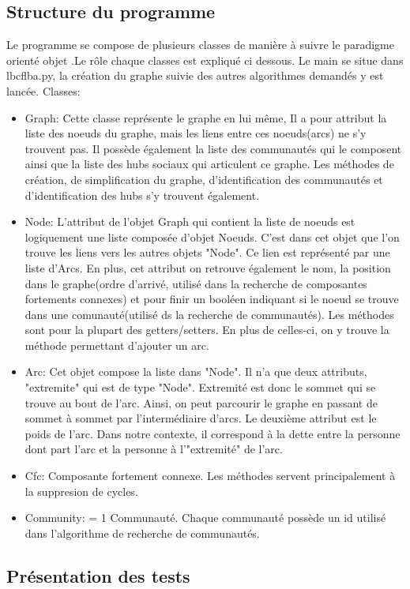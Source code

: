 \documentclass[a4paper]{article}
\begin{document}
\subsection{Structure du programme}
Le programme se compose de plusieurs classes de manière à suivre le paradigme orienté objet .Le rôle chaque classes est expliqué ci dessous. Le main se situe dans lbcflba.py, la création du graphe suivie des autres algorithmes demandés y est lancée.  
\smallbreak
\noindent Classes:
\begin{itemize} 
\item Graph: Cette classe représente le graphe en lui même, Il a pour attribut la liste des noeuds du graphe, mais les liens entre ces noeuds(arcs) ne s'y trouvent pas. Il possède également la liste des communautés qui le composent ainsi que la liste des hubs sociaux qui articulent ce graphe. Les méthodes de création, de simplification du graphe, d'identification des communautés et d'identification des hubs s'y trouvent également.
\item Node: L'attribut de l'objet Graph qui contient la liste de noeuds est logiquement une liste composée d'objet Noeuds. C'est dans cet objet que l'on trouve les liens vers les autres objets "Node". Ce lien est représenté par une liste d'Arcs. En plus, cet attribut on retrouve également le nom, la position dans le graphe(ordre d'arrivé, utilisé dans la recherche de composantes fortements connexes) et pour finir un booléen indiquant si le noeud se trouve dans une comunauté(utilisé ds la recherche de communautés). Les méthodes sont pour la plupart des getters/setters. En plus de celles-ci, on y trouve la méthode permettant d'ajouter un arc. 
\item Arc: Cet objet compose la liste dans "Node". Il n'a que deux attributs, "extremite" qui est de type "Node". Extremité est donc le sommet qui se trouve au bout de l'arc. Ainsi, on peut parcourir le graphe en passant de sommet à sommet par l'intermédiaire d'arcs. Le deuxième attribut est le poids de l'arc. Dans notre contexte, il correspond à la dette entre la personne dont part l'arc et la personne à l'"extremité" de l'arc.
\item Cfc: Composante fortement connexe. Les méthodes servent principalement à la suppresion de cycles.
\item Community: = 1 Communauté. Chaque communauté possède un id utilisé dans l'algorithme de recherche de communautés.   
\end{itemize}
\newpage
\subsection{Présentation des tests}
\end{document}
